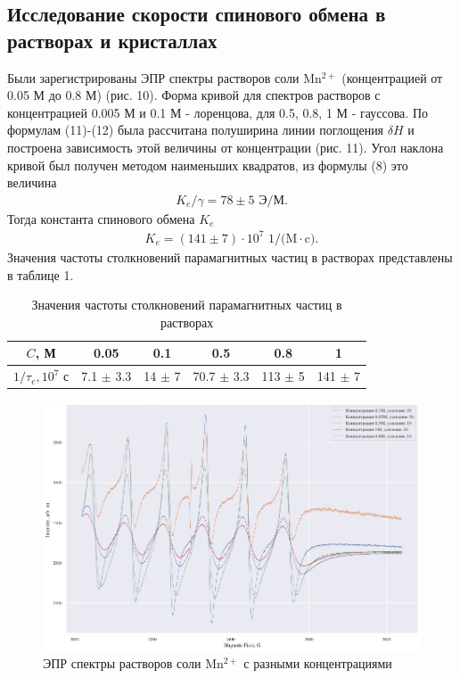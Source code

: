 \documentclass[a4paper,14pt]{article}
\begin{document}
\subsection{Исследование скорости спинового обмена в растворах и кристаллах}
Были зарегистрированы ЭПР спектры растворов соли $ \mathrm{Mn^{2+}} $ (концентрацией от 0.05 М до 0.8 М) (рис. 10). Форма кривой для спектров растворов с концентрацией 0.005 М и 0.1 М - лоренцова, для 0.5, 0.8, 1 М - гауссова. По формулам (11)-(12) была рассчитана полуширина линии поглощения $ \delta H $ и построена зависимость этой величины от концентрации (рис. 11). Угол наклона кривой был получен методом наименьших квадратов, из формулы (8) это величина
\begin{gather*}
	K_e/\gamma = 78 \pm 5 \text{ Э/М}.
\end{gather*}  
Тогда константа спинового обмена $ K_e $
\begin{gather*}
	K_e = (141 \pm 7) \cdot 10^7 \text{ 1/(M} \cdot\text{c)}.
\end{gather*}
Значения частоты столкновений парамагнитных частиц в растворах представлены в таблице 1.
\begin{table}[]
	\centering
	\begin{tabular}{|c|c|c|c|c|c|}
		\hline
		$C$, М             & 0.05          & 0.1        & 0.5            & 0.8         & 1                          \\ \hline
		$1/\tau_e, 10^7$ с & 7.1 $\pm$ 3.3 & 14 $\pm$ 7 & 70.7 $\pm$ 3.3 & 113 $\pm$ 5 & 141 $\pm$ 7 \\ \hline
	\end{tabular}
\caption{Значения частоты столкновений парамагнитных частиц в растворах}
\end{table}
\begin{figure}[h]
	\centering
	\includegraphics{рис10}
	\caption{ЭПР спектры растворов соли $ \mathrm{Mn^{2+}} $ с разными концентрациями}
	\label{fig:10}
\end{figure}
\end{document}
